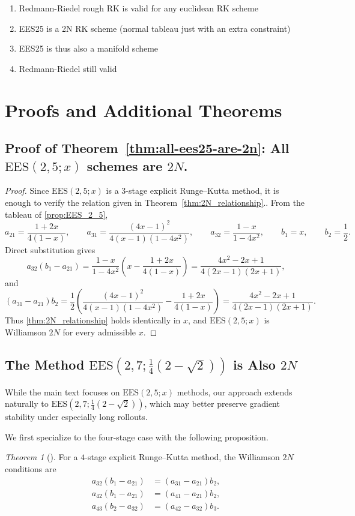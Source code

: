 \documentclass{article}
\theoremstyle{definition}
\theoremstyle{remark}
\newtheorem{theorem}{Theorem}[section]
\begin{document}
\begin{enumerate}
    \item Redmann-Riedel rough RK is valid for any euclidean RK scheme
    \item EES25 is a 2N RK scheme (normal tableau just with an extra constraint)
    \item EES25 is thus also a manifold scheme
    \item Redmann-Riedel still valid
\end{enumerate}

\section{Proofs and Additional Theorems}
\subsection{Proof of Theorem~\ref{thm:all-ees25-are-2n}: All $\mathrm{EES}(2,5;x)$ schemes are $2N$.}
\label{prf:all-ees25-are-2n}
\begin{proof}
Since $\mathrm{EES}(2,5;x)$ is a $3$-stage explicit Runge--Kutta method, it is enough to verify the relation given in Theorem~\ref{thm:2N_relationship}.. From the tableau of \ref{prop:EES_2_5},
\[
a_{21}=\frac{1+2x}{4(1-x)},\qquad
a_{31}=\frac{(4x-1)^2}{4(x-1)(1-4x^2)},\qquad
a_{32}=\frac{1-x}{1-4x^2},\qquad
b_1=x,\qquad b_2=\frac12.
\]
Direct substitution gives
\[
a_{32}(b_1-a_{21})
=
\frac{1-x}{1-4x^2}\left(x-\frac{1+2x}{4(1-x)}\right)
=
\frac{4x^2-2x+1}{4(2x-1)(2x+1)},
\]
and
\[
(a_{31}-a_{21})b_2
=
\frac12\left(
\frac{(4x-1)^2}{4(x-1)(1-4x^2)}
-
\frac{1+2x}{4(1-x)}
\right)
=
\frac{4x^2-2x+1}{4(2x-1)(2x+1)}.
\]
Thus \ref{thm:2N_relationship} holds identically in $x$, and $\mathrm{EES}(2,5;x)$ is Williamson $2N$ for every admissible $x$.
\end{proof}

\subsection{The Method \texorpdfstring{$\mathrm{EES}(2,7;\frac{1}{4}(2-\sqrt{2}))$}{EES(2,7)} is Also $2N$}
While the main text focuses on $\mathrm{EES}(2,5;x)$ methods, our approach extends naturally to $\mathrm{EES}(2,7;\tfrac{1}{4}(2-\sqrt{2}))$, which may better preserve gradient stability under especially long rollouts.

We first specialize \citet[Theorem.~2]{bazavov_2n-storage_2025} to the four-stage case with the following proposition.
\begin{theorem}[{\cite[Theorem~2]{bazavov_2n-storage_2025}}]
    For a $4$-stage explicit Runge--Kutta method, the Williamson $2N$ conditions are
    \begin{align}
    \label{eq:2n-4stage-1}
    a_{32}(b_1-a_{21})&=(a_{31}-a_{21})b_2,\\
    \label{eq:2n-4stage-2}
    a_{42}(b_1-a_{21})&=(a_{41}-a_{21})b_2,\\
    \label{eq:2n-4stage-3}
    a_{43}(b_2-a_{32})&=(a_{42}-a_{32})b_3.
    \end{align}
\end{theorem}
\end{document}
